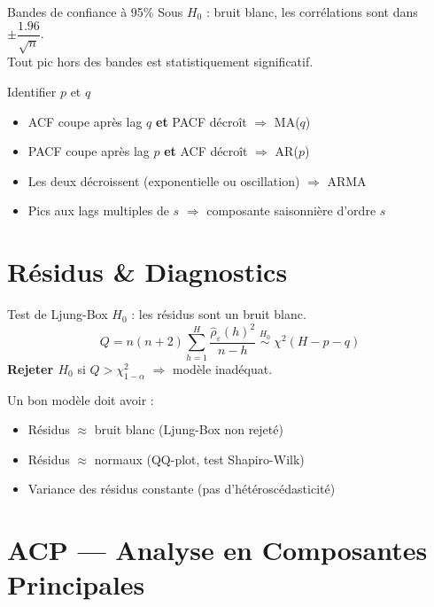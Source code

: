 \documentclass[10pt,a4paper,twocolumn]{article}
\begin{document}
\begin{defbox}{Bandes de confiance à 95\%}
Sous $H_0$ : bruit blanc, les corrélations sont dans $\pm\dfrac{1.96}{\sqrt{n}}$.\\
Tout pic hors des bandes est statistiquement significatif.
\end{defbox}

\begin{defbox}{Identifier $p$ et $q$}
\begin{itemize}[leftmargin=*,itemsep=1pt]
  \item ACF coupe après lag $q$ \textbf{et} PACF décroît $\Rightarrow$ MA($q$)
  \item PACF coupe après lag $p$ \textbf{et} ACF décroît $\Rightarrow$ AR($p$)
  \item Les deux décroissent (exponentielle ou oscillation) $\Rightarrow$ ARMA
  \item Pics aux lags multiples de $s$ $\Rightarrow$ composante saisonnière d'ordre $s$
\end{itemize}
\end{defbox}

\section{Résidus \& Diagnostics}

\begin{formulebox}{Test de Ljung-Box}
$H_0$ : les résidus sont un bruit blanc.
\[
Q = n(n+2)\sum_{h=1}^H \frac{\hat{\rho}_\varepsilon(h)^2}{n-h} \;\overset{H_0}{\sim}\; \chi^2(H-p-q)
\]
\textbf{Rejeter $H_0$} si $Q > \chi^2_{1-\alpha}$ $\Rightarrow$ modèle inadéquat.
\end{formulebox}

Un bon modèle doit avoir :
\begin{itemize}[leftmargin=*,itemsep=1pt]
  \item Résidus $\approx$ bruit blanc (Ljung-Box non rejeté)
  \item Résidus $\approx$ normaux (QQ-plot, test Shapiro-Wilk)
  \item Variance des résidus constante (pas d'hétéroscédasticité)
\end{itemize}

\section{ACP — Analyse en Composantes Principales}
\end{document}
